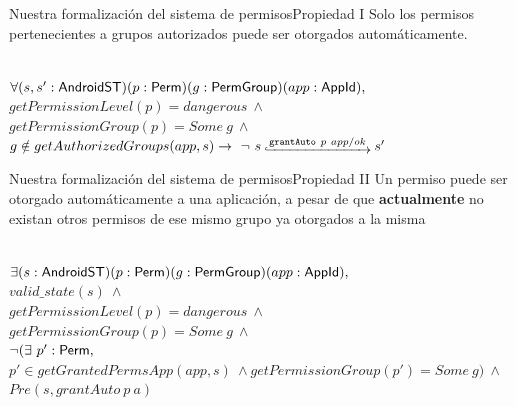 \documentclass[pdf, handout]{beamer} %
\begin{document}
\begin{frame}{Nuestra formalización del sistema de permisos}{Propiedad I}
    Solo los permisos pertenecientes a grupos autorizados puede ser otorgados automáticamente.
    \pause \vspace{20px}
    \begin{prop} \mbox{} \\
        \fontsize{9pt}{15pt}\selectfont
        $\forall (s,s': \mathsf{AndroidST}) (p:\mathsf{Perm}) (g:\mathsf{PermGroup}) (app:\mathsf{AppId}),$ \\
        $getPermissionLevel(p) = dangerous\ \land$ \\
        $getPermissionGroup(p) = Some\ g\ \land$ \\
        $g \notin getAuthorizedGroups(app,s) \rightarrow\ \neg\ \Mathexecrel{s}{\texttt{grantAuto}~p~app/ok}{s'}$ \\
    \end{prop}
\end{frame}

\begin{frame}{Nuestra formalización del sistema de permisos}{Propiedad II}
    Un permiso puede ser otorgado automáticamente a una aplicación, a pesar de que
    \textbf{actualmente} no existan otros permisos de ese mismo grupo ya otorgados a la misma
    \pause \vspace{20px}
    \begin{prop} \mbox{} \\
        \fontsize{9pt}{15pt}\selectfont
        $\exists (s:\mathsf{AndroidST}) (p:\mathsf{Perm}) (g:\mathsf{PermGroup}) (app:\mathsf{AppId}),$ \\
        $valid\_state(s)\ \land$ \\
        $getPermissionLevel(p) = dangerous\ \land$ \\
        $getPermissionGroup(p) = Some\ g\ \land$ \\
        $\neg (\exists\ p': \mathsf{Perm},$\\
        \hspace{10px}$p' \in getGrantedPermsApp(app,s)~ \land getPermissionGroup(p') = Some\ g)\ \land$\\
        $Pre(s, grantAuto~p~a)$
    \end{prop}
\end{frame}
\end{document}
